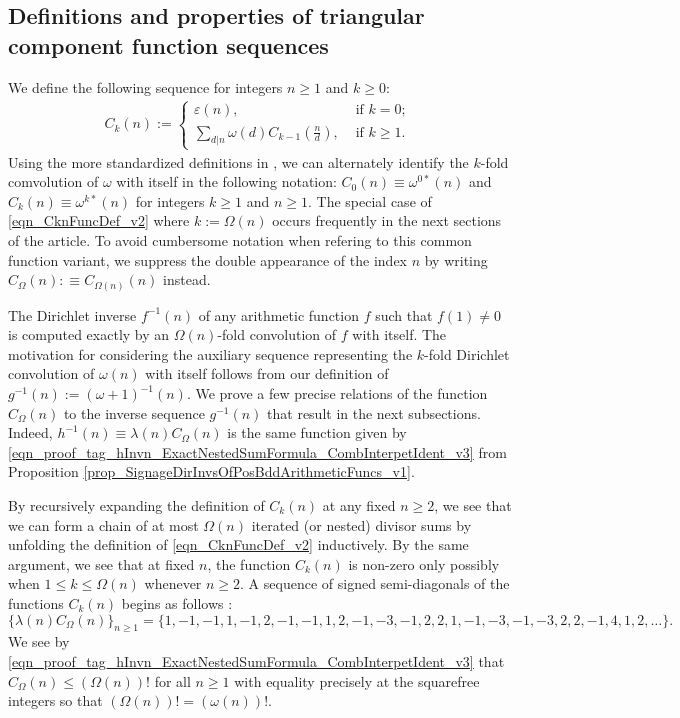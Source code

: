 \documentclass[11pt,reqno,a4letter]{article}
\numberwithin{figure}{section}
\numberwithin{table}{section}
\newcommand{\seqnum}[1]{\href{http://oeis.org/#1}{\color{ProcessBlue}{\underline{#1}}}}
\theoremstyle{plain}
\numberwithin{theorem}{section}
\theoremstyle{definition}
\begin{document}
\subsection{Definitions and properties of triangular component function sequences} 

We define the following sequence for integers $n \geq 1$ and $k \geq 0$: 
\begin{align} 
\label{eqn_CknFuncDef_v2} 
C_k(n) := \begin{cases} 
     \varepsilon(n), & \text{ if $k = 0$; } \\ 
     \sum\limits_{d|n} \omega(d) C_{k-1}\left(\frac{n}{d}\right), & \text{ if $k \geq 1$. } 
     \end{cases} 
\end{align} 
Using the more standardized definitions in \cite[\S 2]{ANT-BATEMAN-DIAMOND}, we can alternately 
identify the $k$-fold comvolution of $\omega$ with itself in the following notation: 
$C_0(n) \equiv \omega^{0\ast}(n)$ and $C_k(n) \equiv \omega^{k\ast}(n)$ for 
integers $k \geq 1$ and $n \geq 1$. 
The special case of \eqref{eqn_CknFuncDef_v2} where 
$k := \Omega(n)$ occurs frequently in the next sections of the 
article. To avoid cumbersome notation when refering to this common function variant, we suppress the 
double appearance of the index $n$ by writing $C_{\Omega}(n) :\equiv C_{\Omega(n)}(n)$ instead. 

The Dirichlet 
inverse $f^{-1}(n)$ of any arithmetic function $f$ such that $f(1) \neq 0$ is 
computed exactly by an $\Omega(n)$-fold convolution of $f$ with itself. 
The motivation for considering the auxiliary sequence representing the $k$-fold 
Dirichlet convolution of $\omega(n)$ with itself follows from our definition of 
$g^{-1}(n) := (\omega+1)^{-1}(n)$. 
We prove a few precise relations of the function $C_{\Omega}(n)$ to the inverse 
sequence $g^{-1}(n)$ that result in the next subsections. 
Indeed, 
$h^{-1}(n) \equiv \lambda(n) C_{\Omega}(n)$ is the same function given by 
\eqref{eqn_proof_tag_hInvn_ExactNestedSumFormula_CombInterpetIdent_v3} from 
Proposition \ref{prop_SignageDirInvsOfPosBddArithmeticFuncs_v1}. 

By recursively expanding the definition of $C_k(n)$ 
at any fixed $n \geq 2$, we see that 
we can form a chain of at most $\Omega(n)$ iterated (or nested) divisor sums by 
unfolding the definition of \eqref{eqn_CknFuncDef_v2} inductively. 
By the same argument, we see that at fixed $n$, the function 
$C_k(n)$ is non-zero only possibly when 
$1 \leq k \leq \Omega(n)$ whenever $n \geq 2$. 
A sequence of signed semi-diagonals of the functions $C_k(n)$ begins as follows 
\cite[\seqnum{A008480}]{OEIS}: 
\[
\{\lambda(n) C_{\Omega}(n) \}_{n \geq 1} = \{
     1, -1, -1, 1, -1, 2, -1, -1, 1, 2, -1, -3, -1, 2, 2, 1, -1, -3, -1, 
     -3, 2, 2, -1, 4, 1, 2, \ldots \}. 
\]
We see by 
\eqref{eqn_proof_tag_hInvn_ExactNestedSumFormula_CombInterpetIdent_v3} 
that $C_{\Omega}(n) \leq (\Omega(n))!$ for all $n \geq 1$ with 
equality precisely at the squarefree integers so that 
$(\Omega(n))! = (\omega(n))!$. 
\end{document}
